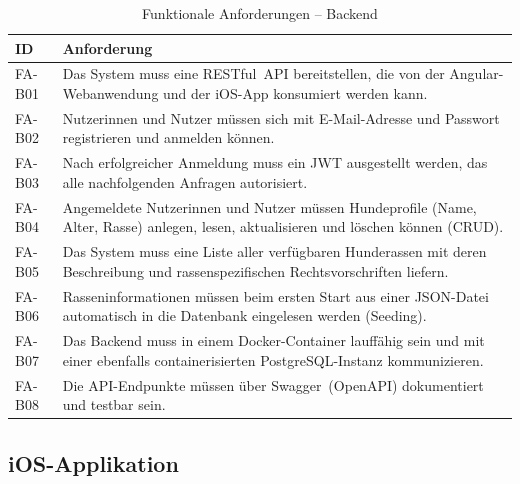 \begin{table}[H]
  \centering
  \caption{Funktionale Anforderungen – Backend}
  \label{tab:fa-backend}
  \begin{tabularx}{\textwidth}{|l|Y|}
    \hline
    \textbf{ID} & \textbf{Anforderung} \\
    \hline
    FA-B01 & Das System muss eine RESTful~API bereitstellen, die von der Angular-Webanwendung
             und der iOS-App konsumiert werden kann. \\
    \hline
    FA-B02 & Nutzer\-innen und Nutzer müssen sich mit E-Mail-Adresse und Passwort registrieren
             und anmelden können. \\
    \hline
    FA-B03 & Nach erfolgreicher Anmeldung muss ein JWT ausgestellt werden, das alle
             nachfolgenden Anfragen autorisiert. \\
    \hline
    FA-B04 & Angemeldete Nutzer\-innen und Nutzer müssen Hundeprofile (Name, Alter, Rasse)
             anlegen, lesen, aktualisieren und löschen können (CRUD). \\
    \hline
    FA-B05 & Das System muss eine Liste aller verfügbaren Hunderassen mit deren Beschreibung
             und rassenspezifischen Rechtsvorschriften liefern. \\
    \hline
    FA-B06 & Rasseninformationen müssen beim ersten Start aus einer JSON-Datei automatisch
             in die Datenbank eingelesen werden (Seeding). \\
    \hline
    FA-B07 & Das Backend muss in einem Docker-Container lauffähig sein und mit einer
             ebenfalls containerisierten PostgreSQL-Instanz kommunizieren. \\
    \hline
    FA-B08 & Die API-Endpunkte müssen über Swagger~(OpenAPI) dokumentiert und testbar sein. \\
    \hline
  \end{tabularx}
\end{table}

\subsection{iOS-Applikation}
\label{subsec:fa-ios}

